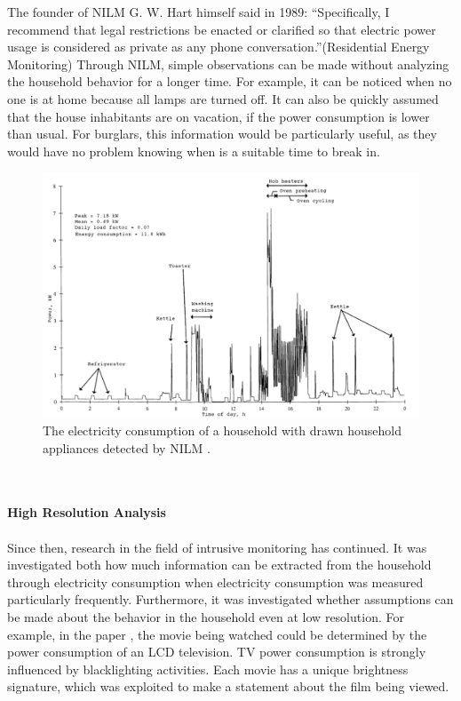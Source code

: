 The founder of NILM G. W. Hart himself said in 1989: ``Specifically, I recommend that legal restrictions be enacted or clarified so that electric power usage is considered as private as any phone conversation.''(Residential Energy Monitoring)
Through NILM, simple observations can be made without analyzing the household behavior for a longer time. For example, it can be noticed when no one is at home because all lamps are turned off. It can also be quickly assumed that the house inhabitants are on vacation, if the power consumption is lower than usual. For burglars, this information would be particularly useful, as they would have no problem knowing when is a suitable time to break in.
\begin{figure}[tbp]
  \centering
  \includegraphics[width=1\textwidth]{images/nilm.png}
  \caption[Detected NILM Appliances]{The electricity consumption of a household with drawn household appliances detected by NILM \cite{quinn2009privacy}.}
  \label{fig:Nilm}
\end{figure}
\\
\\
\textbf{High Resolution Analysis}
\\
\\
Since then, research in the field of intrusive monitoring has continued. It was investigated both how much information can be extracted from the household through electricity consumption when electricity consumption was measured particularly frequently. Furthermore, it was investigated whether assumptions can be made about the behavior in the household even at low resolution.
For example, in the paper \cite{greveler2012multimedia}, the movie being watched could be determined by the power consumption of an LCD television. TV power consumption is strongly influenced by blacklighting activities. Each movie has a unique brightness signature, which was exploited to make a statement about the film being viewed.\\
